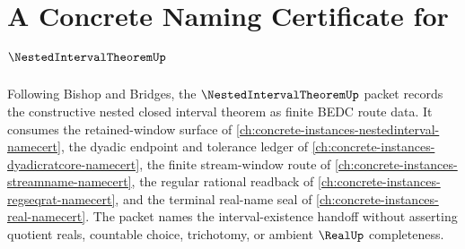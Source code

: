 \chapter{A Concrete Naming Certificate for $\NestedIntervalTheoremUp$}
\label{ch:concrete-instances-nested-interval-theorem-namecert}

Following Bishop and Bridges, the $\NestedIntervalTheoremUp$ packet records the constructive nested closed interval theorem as finite BEDC route data. It consumes the retained-window surface of \autoref{ch:concrete-instances-nestedinterval-namecert}, the dyadic endpoint and tolerance ledger of \autoref{ch:concrete-instances-dyadicratcore-namecert}, the finite stream-window route of \autoref{ch:concrete-instances-streamname-namecert}, the regular rational readback of \autoref{ch:concrete-instances-regseqrat-namecert}, and the terminal real-name seal of \autoref{ch:concrete-instances-real-namecert}. The packet names the interval-existence handoff without asserting quotient reals, countable choice, trichotomy, or ambient $\RealUp$ completeness.

